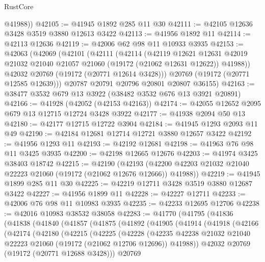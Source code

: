 \begin{lexlean}{RustCore}
\begin{coremodule}
        @41988))
@42105 := @41945 @1892 @285 @11 @30
@42111 := @42105 @12636 @3428 @3519 @3880 @12613 @3422
@42113 := @41956 @1892 @11
@42114 := @42113 @12636
@42119 := @42006 @62 @98 @11 @10933 @3935
@42153 := @42063
    (@42069
      (@42101
        (@42111
          (@42114
            (@42119
              @12621
              @12631
              @42019
              @21032
              @21040
              @21057
              @21060
              (@19172 (@21062 @12631 @12622))
              @41988))
          @42032
          @20769
          (@19172 (@20771 @12614 @3428)))
        @20769
        (@19172 (@20771 @12585 @12639)))
      @20787
      @20791
      @20796
      @20801
      @20807
      @36155)
@42163 := @38477 @3532 @679 @13 @3922 (@38482 @3532 @676 @13 @3921 @20891)
@42166 := @41928 (@42052 (@42153 @42163))
@42174 := @42055 @12652 @2095 @679 @13 @12715 @12724 @3428 @3922
@42177 := @41938 @2094 @50 @13
@42180 := @42177 @12715 @12722 @3904
@42184 := @41945 @1293 @2093 @11 @49
@42190 := @42184 @12681 @12714 @12721 @3880 @12657 @3422
@42192 := @41956 @1293 @11
@42193 := @42192 @12681
@42198 := @41963 @76 @98 @11 @3425 @3935
@42200 := @42198 @12665 @12676
@42203 := @41974 @3425 @38403 @18742
@42215 := @42190
    (@42193 (@42200 @42203 @21032 @21040 @22223 @21060 (@19172 (@21062 @12676 @12666)) @41988))
@42219 := @41945 @1899 @285 @11 @30
@42225 := @42219 @12711 @3428 @3519 @3880 @12687 @3422
@42227 := @41956 @1899 @11
@42228 := @42227 @12711
@42233 := @42006 @76 @98 @11 @10983 @3935
@42235 := @42233 @12695 @12706
@42238 := @42016 @10983 @38532 @38058
@42283 := @41770
    (@41795
      (@41836
        (@41838
          (@41840
            (@41857
              (@41875
                (@41892
                  (@41905
                    (@41914
                      (@41918
                        (@42166
                          (@42174
                            (@42180
                              (@42215
                                (@42225
                                  (@42228
                                    (@42235
                                      @42238
                                      @21032
                                      @21040
                                      @22223
                                      @21060
                                      (@19172 (@21062 @12706 @12696))
                                      @41988))
                                  @42032
                                  @20769
                                  (@19172 (@20771 @12688 @3428)))
                                @20769

\end{coremodule}
\end{lexlean}
